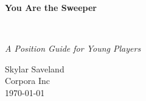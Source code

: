 
\clearpage
\vspace*{1.5in}
\begin{center}
  \begin{minipage}{\textwidth}
    \centering
    \Huge\bfseries
    \linespread{1.25}\selectfont
  You Are the Sweeper
  \end{minipage}
  \\[3em]
  {\Large\itshape\linespread{1.3}\selectfont
  A Position Guide for Young Players\par}
  \vfill
  {\large Skylar Saveland}
  \\[1em]
  {\large Corpora Inc}
  \\[1em]
  {\large \today}
\end{center}
\clearpage
